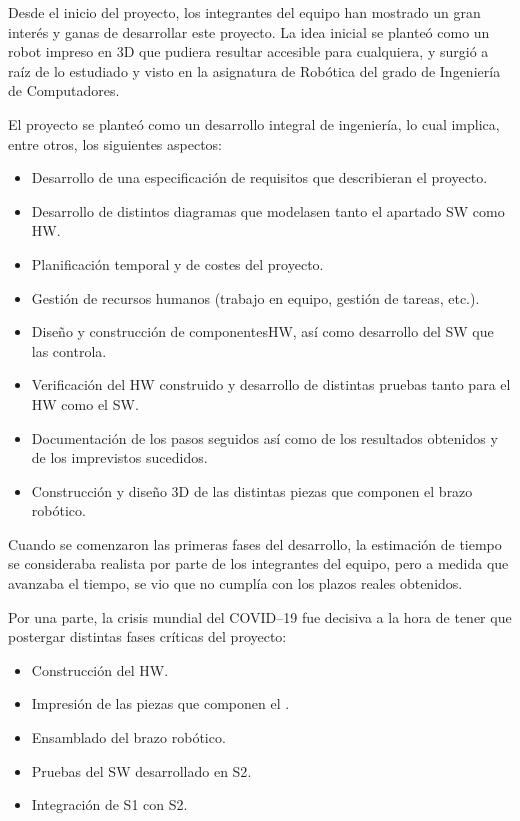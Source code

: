 Desde el inicio del proyecto, los integrantes del equipo han mostrado un gran interés
y ganas de desarrollar este proyecto. La idea inicial se planteó como un robot
impreso en 3D que pudiera resultar accesible para cualquiera, y surgió a raíz de lo estudiado
y visto en la asignatura de Robótica del grado de Ingeniería de Computadores.

El proyecto se planteó como un desarrollo integral de ingeniería, lo cual implica, entre otros, los siguientes aspectos:
\begin{itemize}
    \item Desarrollo de una especificación de requisitos que describieran el proyecto.
    \item Desarrollo de distintos diagramas que modelasen tanto el apartado
    \ac{SW} como \ac{HW}.
    \item Planificación temporal y de costes del proyecto.
    \item Gestión de recursos humanos (trabajo en equipo, gestión de tareas, etc.).
    \item Diseño y construcción de componentes\ac{HW}, así como desarrollo del \ac{SW} que las controla.
    \item Verificación del \ac{HW} construido y desarrollo de distintas pruebas tanto
    para el \ac{HW} como el \ac{SW}.
    \item Documentación de los pasos seguidos así como de los resultados obtenidos
    y de los imprevistos sucedidos.
    \item Construcción y diseño 3D de las distintas piezas que componen el brazo
    robótico.
\end{itemize}

Cuando se comenzaron las primeras fases del desarrollo, la estimación de tiempo
se consideraba realista por parte de los integrantes del equipo, pero a medida
que avanzaba el tiempo, se vio que no cumplía con los plazos reales obtenidos.

Por una parte, la crisis mundial del COVID--19 fue decisiva a la hora de tener que
postergar distintas fases críticas del proyecto:
\begin{itemize}
    \item Construcción del \ac{HW}.
    \item Impresión de las piezas que componen el \pArm{}.
    \item Ensamblado del brazo robótico.
    \item Pruebas del \ac{SW} desarrollado en \ac{S2}.
    \item Integración de \ac{S1} con \ac{S2}.
\end{itemize}

